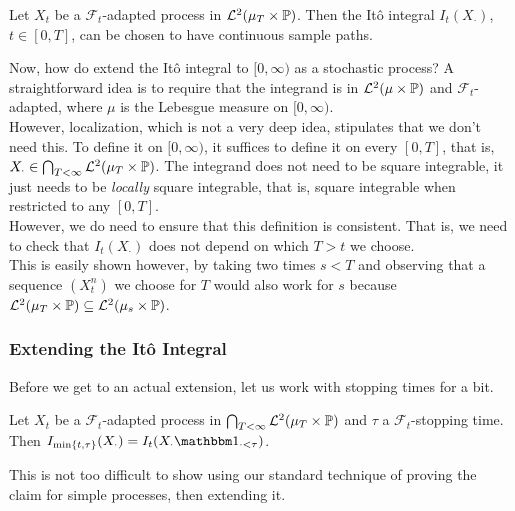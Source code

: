 \begin{lemma}
	Let $X_t$ be a $\mathcal{F}_t$-adapted process in $\mathcal{L}^2(\mu_T\times\mathbb{P})$. Then the It\^{o} integral $I_t(X_\cdot)$, $t\in[0,T]$, can be chosen to have continuous sample paths.
\end{lemma}

Now, how do extend the It\^{o} integral to $[0,\infty)$ as a stochastic process? A straightforward idea is to require that the integrand is in $\mathcal{L}^2(\mu\times\mathbb{P})$ and $\mathcal{F}_t$-adapted, where $\mu$ is the Lebesgue measure on $[0,\infty)$.\\
However, localization, which is not a very deep idea, stipulates that we don't need this. To define it on $[0,\infty)$, it suffices to define it on every $[0,T]$, that is, $X_\cdot \in \bigcap_{T < \infty} \mathcal{L}^2(\mu_T\times\mathbb{P})$. The integrand does not need to be square integrable, it just needs to be \textit{locally} square integrable, that is, square integrable when restricted to any $[0,T]$.\\
However, we do need to ensure that this definition is consistent. That is, we need to check that $I_t(X_\cdot)$ does not depend on which $T>t$ we choose.\\

This is easily shown however, by taking two times $s<T$ and observing that a sequence $(X_t^n)$ we choose for $T$ would also work for $s$ because $\mathcal{L}^2(\mu_T\times\mathbb{P})\subseteq\mathcal{L}^2(\mu_s\times\mathbb{P})$.

\subsubsection{Extending the It\^{o} Integral}

Before we get to an actual extension, let us work with stopping times for a bit.

\begin{lemma}
	\label{ito: stopping time lemma 1}
	Let $X_t$ be a $\mathcal{F}_t$-adapted process in $\bigcap_{T<\infty} \mathcal{L}^2(\mu_T\times\mathbb{P})$ and $\tau$ a $\mathcal{F}_t$-stopping time. Then $I_{\min\{t,\tau\}}(X_\cdot) = I_t(X_\cdot \indic_{\cdot < \tau})$.
\end{lemma}

This is not too difficult to show using our standard technique of proving the claim for simple processes, then extending it.\\

